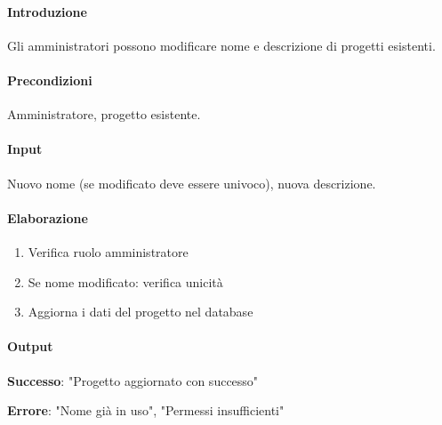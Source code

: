 \vspace{0.5cm}

\newpage


\begin{reqbox}[title=REQ-FUN-05: Modifica Progetto (solo Admin)]
\label{subsubsec:req-modifica-progetto}

\paragraph{Introduzione}
Gli amministratori possono modificare nome e descrizione di progetti esistenti.

\paragraph{Precondizioni}
Amministratore, progetto esistente.

\paragraph{Input}
Nuovo nome (se modificato deve essere univoco), nuova descrizione.

\paragraph{Elaborazione}
\begin{enumerate}[leftmargin=1.1em]
\item Verifica ruolo amministratore
\item Se nome modificato: verifica unicità
\item Aggiorna i dati del progetto nel database
\end{enumerate}

\paragraph{Output}
\textbf{Successo}: "Progetto aggiornato con successo"

\textbf{Errore}: "Nome già in uso", "Permessi insufficienti"

\end{reqbox}

\vspace{0.5cm}

\newpage

